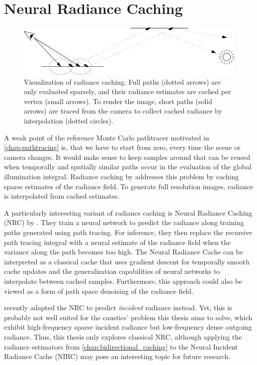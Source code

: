 
\chapter{Neural Radiance Caching}
\label{chap:nrc}
\begin{figure}[htb!]
    \centering
    \includegraphics{figures/asy/nrc.pdf}
    \caption{Visualization of radiance caching. Full paths (dotted arrows) are only evaluated sparsely, and their radiance estimates are cached per vertex (small arrows). To render the image, short paths (solid arrows) are traced from the camera to collect cached radiance by interpolation (dotted circles).}
    \label{fig:nrc_overview}
\end{figure}
A weak point of the reference Monte Carlo pathtracer motivated in \cref{chap:pathtracing} is, that we have to start from zero, every time the scene or camera changes.
It would make sense to keep samples around that can be reused when temporally and spatially similar paths occur in the evaluation of the global illumination integral.
Radiance caching by \textcite{ward1988} addresses this problem by caching sparse estimates of the radiance field.
To generate full resolution images, radiance is interpolated from cached estimates.

A particularly interesting variant of radiance caching is Neural Radiance Caching (NRC) by \textcite{muller2021}.
They train a neural network to predict the radiance along training paths generated using path tracing.
For inference, they then replace the recursive path tracing integral with a neural estimate of the radiance field when the variance along the path becomes too high.
The Neural Radiance Cache can be interpreted as a classical cache that uses gradient descent for temporally smooth cache updates and the generalization capabilities of neural networks to interpolate between cached samples.
Furthermore, this approach could also be viewed as a form of path space denoising of the radiance field.

\textcite{dereviannykh2024} recently adapted the NRC to predict \emph{incident} radiance instead.
Yet, this is probably not well suited for the caustics' problem this thesis aims to solve, which exhibit high-frequency sparse incident radiance but low-frequency dense outgoing radiance.
Thus, this thesis only explores classical NRC, although applying the radiance estimators from \cref{chap:bidirectional_caching} to the Neural Incident Radiance Cache (NIRC) may pose an interesting topic for future research.

